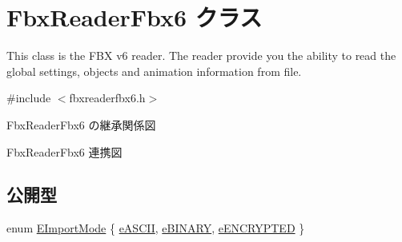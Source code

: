 \hypertarget{class_fbx_reader_fbx6}{}\section{Fbx\+Reader\+Fbx6 クラス}
\label{class_fbx_reader_fbx6}


This class is the F\+BX v6 reader. The reader provide you the ability to read the global settings, objects and animation information from file.  




{\ttfamily \#include $<$fbxreaderfbx6.\+h$>$}



Fbx\+Reader\+Fbx6 の継承関係図


Fbx\+Reader\+Fbx6 連携図
\subsection*{公開型}
\begin{DoxyCompactItemize}
\item 
enum \hyperlink{class_fbx_reader_fbx6_ac6bc45d165880315e2657abf7ca16495}{E\+Import\+Mode} \{ \hyperlink{class_fbx_reader_fbx6_ac6bc45d165880315e2657abf7ca16495a2cd7b49f48411efc36b3b9d095334ced}{e\+A\+S\+C\+II}, 
\hyperlink{class_fbx_reader_fbx6_ac6bc45d165880315e2657abf7ca16495ae23324d34805f8659977df8340743af1}{e\+B\+I\+N\+A\+RY}, 
\hyperlink{class_fbx_reader_fbx6_ac6bc45d165880315e2657abf7ca16495af8fb0ae704cf55ad6d0df690c7242b2a}{e\+E\+N\+C\+R\+Y\+P\+T\+ED}
 \}
\end{DoxyCompactItemize}

